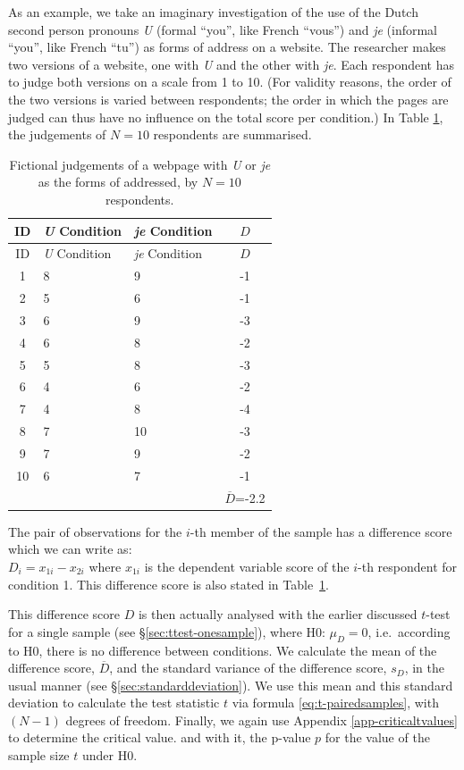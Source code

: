 \documentclass[
]{book}
\begin{document}
As an example, we take an imaginary investigation of the use of the
Dutch second person pronouns \emph{U} (formal ``you'', like French ``vous'') and \emph{je} (informal ``you'', like French ``tu'') as forms of address on a website. The researcher makes two versions
of a website, one with \emph{U} and the other with \emph{je}. Each
respondent has to judge both versions on a scale from 1 to 10. (For validity
reasons, the order of the two versions is varied between respondents;
the order in which the pages are judged can thus
have no influence on the total score per condition.) In Table
\ref{tab:data-uje-paired}, the judgements of \(N=10\)
respondents are summarised.

\begin{longtable}[]{@{}cllc@{}}
\caption{\label{tab:data-uje-paired} Fictional judgements of a webpage
with \emph{U} or \emph{je} as the forms of addressed, by \(N=10\) respondents.}\tabularnewline
\toprule
ID & \emph{U} Condition & \emph{je} Condition & \(D\) \\
\midrule
\endfirsthead
\toprule
ID & \emph{U} Condition & \emph{je} Condition & \(D\) \\
\midrule
\endhead
1 & 8 & 9 & -1 \\
2 & 5 & 6 & -1 \\
3 & 6 & 9 & -3 \\
4 & 6 & 8 & -2 \\
5 & 5 & 8 & -3 \\
6 & 4 & 6 & -2 \\
7 & 4 & 8 & -4 \\
8 & 7 & 10 & -3 \\
9 & 7 & 9 & -2 \\
10 & 6 & 7 & -1 \\
& & & \(\overline{D}\)=-2.2 \\
\bottomrule
\end{longtable}

The pair of observations for the \(i\)-th member of the sample has a
difference score which we can write as:\\
\(D_i = x_{1i} - x_{2i}\) where \(x_{1i}\) is the dependent
variable score of the \(i\)-th respondent for condition 1. This
difference score is also stated in
Table~\ref{tab:data-uje-paired}.

This difference score \(D\) is then actually analysed with the earlier discussed \(t\)-test for a single sample (see §\ref{sec:ttest-onesample}), where H0: \(\mu_D=0\), i.e.~according to H0, there is no
difference between conditions. We calculate the mean of the difference score,
\(\overline{D}\), and the standard variance of the difference score, \(s_{D}\),
in the usual manner (see
§\ref{sec:standarddeviation}). We use this mean and this
standard deviation to calculate the test statistic \(t\) via formula
\eqref{eq:t-pairedsamples}, with \((N-1)\) degrees of freedom. Finally,
we again use
Appendix \ref{app-criticaltvalues} to determine the critical value.
and with it, the p-value \(p\) for the value of the sample size
\(t\) under H0.
\end{document}
